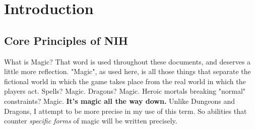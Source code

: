 \chapter{Introduction}
\section{Core Principles of NIH}

\begin{DndSidebar}[float=b]{What is Magic?}
    That word is used throughout these documents, and deserves a little more reflection. "Magic", as used here, is all those things that separate the fictional world in which the game takes place from the real world in which the players act. Spells? Magic. Dragons? Magic. Heroic mortals breaking "normal" constraints? Magic. \textbf{It's magic all the way down.} Unlike Dungeons and Dragons, I attempt to be more precise in my use of this term. So abilities that counter \textit{specific forms} of magic will be written precisely.
\end{DndSidebar}

